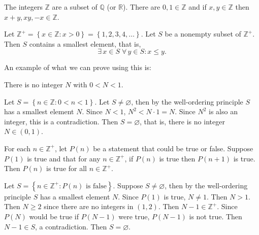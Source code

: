 \documentclass{notes}
\begin{document}
The integers $\mathbb Z$ are a subset of $\mathbb Q$ (or $\mathbb R$).
There are $0, 1 \in \mathbb Z$ and if $x, y \in \mathbb Z$ then $x + y, x y, -x \in \mathbb Z$.

\begin{thm}
  Let $\mathbb Z^+ = \left \{ x \in \mathbb Z : x > 0 \right \} = \left \{ 1, 2, 3, 4, \dots \right \}$.
  Let $S$ be a nonempty subset of $\mathbb Z^+$.
  Then $S$ contains a smallest element, that is, 
  \[
    \exists \, x \in S \; \forall \, y \in S: x \leq y.
  \]
\end{thm}

An example of what we can prove using this is: 
\begin{prop}
  There is no integer $N$ with $0 < N < 1$.
\end{prop}

\begin{prf}
  Let $S = \left \{ n \in \mathbb Z : 0 < n < 1 \right \}$.
  Let $S \neq \varnothing$, then by the well-ordering principle $S$ has a smallest element $N$.
  Since $N < 1$, $N^2 < N \cdot 1 = N$.
  Since $N^2$ is also an integer, this is a contradiction.
  Then $S = \varnothing$, that is, there is no integer $N \in (0, 1)$.
\end{prf}

\begin{thm}[Induction]
  For each $n \in \mathbb Z^+$, let $P(n)$ be a statement that could be true or false.
  Suppose $P(1)$ is true and that for any $n \in \mathbb Z^+$, if $P(n)$ is true then $P(n + 1)$ is true.
  Then $P(n)$ is true for all $n \in \mathbb Z^+$.
\end{thm}

\begin{prf}
  Let $S = \left \{ n \in \mathbb Z^+ : P(n) \text{ is false} \right \}$.
  Suppose $S \neq \varnothing$, then by the well-ordering principle $S$ has a smallest element $N$.
  Since $P(1)$ is true, $N \neq 1$.
  Then $N > 1$.
  Then $N \geq 2$ since there are no integers in $(1, 2)$.
  Then $N - 1 \in \mathbb Z^+$.
  Since $P(N)$ would be true if $P(N - 1)$ were true, $P(N - 1)$ is not true.
  Then $N - 1 \in S$, a contradiction.
  Then $S = \varnothing$.
\end{prf}
\end{document}
